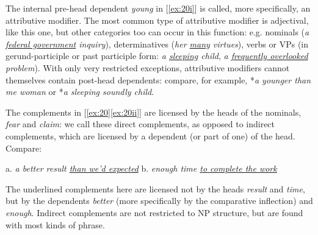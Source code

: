 The internal pre-head dependent \textit{young} in [\ref{ex:20i}] is called, more specifically, an {attributive modifier}. The most common type of attributive modifier is adjectival, like this one, but other categories too can occur in this function: e.g. nominals (\textit{a \uline{federal government} inquiry}), determinatives (\textit{her \uline{many} virtues}), verbs or VPs (in gerund-participle or past participle form: \textit{a \uline{sleeping} child}, \textit{a \uline{frequently overlooked} problem}). With only very restricted exceptions, attributive modifiers cannot themselves contain post-head dependents: compare, for example, *\textit{a younger than me woman} or *\textit{a sleeping soundly child}.

The complements in [\ref{ex:20}\ref{ex:20ii}] are licensed by the heads of the nominals, \textit{fear} and \textit{claim}: we call these {direct complements}, as opposed to {indirect complements}, which are licensed by a dependent (or part of one) of the head. Compare:
\begin{examples}
\item \label{ex:22}
    a. \textit{a better result \uline{than we'd expected}}\hspace{3em}
    b. \textit{enough time \uline{to complete the work}}
\end{examples}
The underlined complements here are licensed not by the heads \textit{result} and \textit{time}, but by the dependents \textit{better} (more specifically by the comparative inflection) and \textit{enough}. Indirect complements are not restricted to NP structure, but are found with most kinds of phrase.


